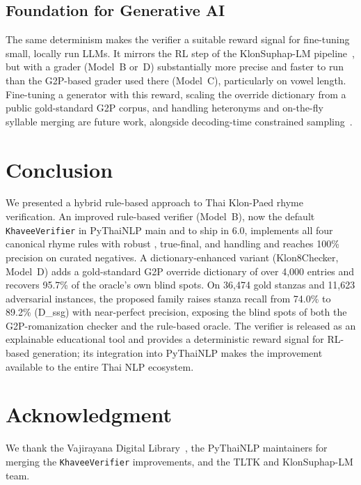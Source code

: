 \documentclass[conference]{IEEEtran}
\begin{document}
\subsection{Foundation for Generative AI}

The same determinism makes the verifier a suitable reward signal for
fine-tuning small, locally run LLMs. It mirrors the RL step of the
KlonSuphap-LM pipeline~\cite{klonsuphap}, but with a grader (Model~B or~D)
substantially more precise and faster to run than the G2P-based grader used there (Model~C),
particularly on vowel length. Fine-tuning a generator with this reward,
scaling the override dictionary from a public gold-standard G2P corpus, and
handling heteronyms and on-the-fly syllable merging are future work,
alongside decoding-time constrained sampling~\cite{geng2023}.


\section{Conclusion}

We presented a hybrid rule-based approach to Thai Klon-Paed rhyme
verification. An improved rule-based verifier (Model~B), now the default
\texttt{KhaveeVerifier} in PyThaiNLP main and to ship in 6.0, implements all four canonical
rhyme rules with robust , true-final, and  handling and reaches
100\% precision on curated negatives. A dictionary-enhanced variant
(Klon8Checker, Model~D) adds a gold-standard G2P override dictionary of over
4{,}000 entries and recovers 95.7\% of the oracle's own blind spots. On
36{,}474 gold stanzas and 11{,}623 adversarial instances, the proposed
family raises stanza recall from 74.0\% to 89.2\% (D\_ssg) with
near-perfect precision, exposing the blind spots of both the
G2P-romanization checker and the rule-based oracle. The verifier is
released as an explainable educational tool and provides a deterministic
reward signal for RL-based generation; its integration into PyThaiNLP
makes the improvement available to the entire Thai NLP ecosystem.

\section*{Acknowledgment}
We thank the Vajirayana Digital Library~\cite{vajirayana}, the PyThaiNLP
maintainers for merging the \texttt{KhaveeVerifier} improvements, and the
TLTK and KlonSuphap-LM team.
\end{document}
